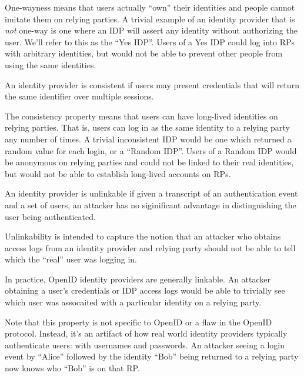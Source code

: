 \documentclass{llncs}
\begin{document}
One-wayness means that users actually ``own'' their identities and
people cannot imitate them on relying parties. A trivial example of an
identity provider that is \textit{not} one-way is one where an IDP
will assert any identity without authorizing the user.  We'll refer to
this as the ``Yes IDP''. Users of a Yes IDP could log into RPs with
arbitrary identities, but would not be able to prevent other people
from using the same identities.

\begin{definition}[Consistency]
\label{def:consistency}
An identity provider is consistent if users may present credentials
that will return the same identifier over multiple sessions.
\end{definition}

The consistency property means that users can have long-lived
identities on relying parties. That is, users can log in as the same
identity to a relying party any number of times. A trivial
inconsistent IDP would be one which returned a random value for each
login, or a ``Random IDP''. Users of a Random IDP would be anonymous
on relying parties and could not be linked to their real identities,
but would not be able to establish long-lived accounts on RPs.

\begin{definition}[Unlinkability]
\label{def:unlinkability}
An identity provider is unlinkable if given a transcript of an
authentication event and a set of users, an attacker has no
siginificant advantage in distinguishing the user being authenticated.
\end{definition}

Unlinkability is intended to capture the notion that an attacker who
obtains access logs from an identity provider and relying party should
not be able to tell which the ``real'' user was logging in.

In practice, OpenID identity providers are generally linkable. An
attacker obtaining a user's credentials or IDP access logs would be
able to trivially see which user was assocaited with a particular
identity on a relying party.

Note that this property is not specific to OpenID or a flaw in the
OpenID protocol. Instead, it's an artifact of how real world identity
providers typically authenticate users: with usernames and
passwords. An attacker seeing a login event by ``Alice'' followed by
the identity ``Bob'' being returned to a relying party now knows who
``Bob'' is on that RP.
\end{document}
